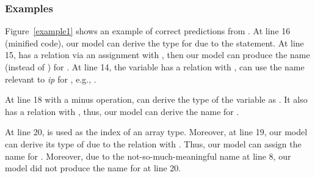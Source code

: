 \vspace{-4pt}
\subsubsection{Examples}
\label{sec:eval-example}

Figure~\ref{example1} shows an example of correct predictions from
{\tool}.  At line 16 (minified code), our model can derive the
type  for  due to the  statement. At line
15,  has a relation via an assignment
with , then our model can produce the
name  (instead of ) for . At
line 14, the variable  has a relation
with , {\tool} can use the name relevant to
{\em ip} for , e.g., .

At line 18 with a minus operation, {\tool} can derive the type of the
variable  as . It also has a relation
with , thus, our model
can derive the name  for .

At line 20,  is used as the index of an array type.
Moreover, at line 19, our model can derive its type of 
due to the relation with . Thus, our model
can assign the name  for . Moreover,
due to the not-so-much-meaningful name  at line 8,
our model did not produce the name for  at line 20.


